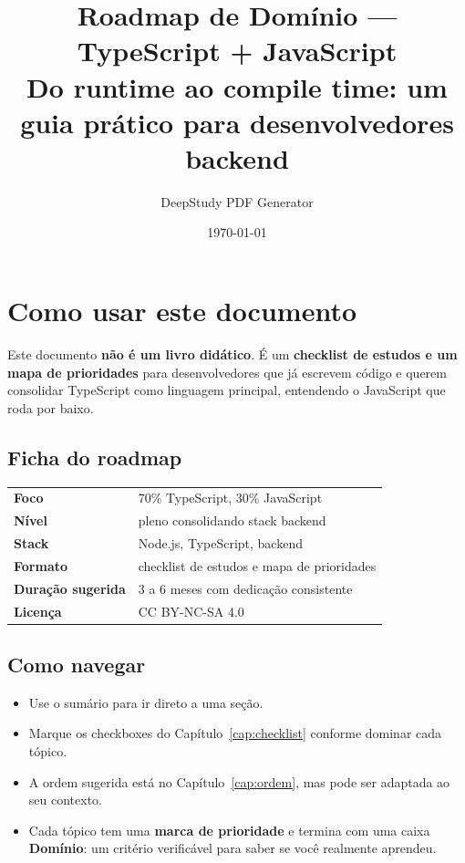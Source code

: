 \documentclass[12pt,a4paper,oneside]{book}
\title{Roadmap de Domínio --- TypeScript + JavaScript\\[0.4em]\Large Do runtime ao compile time: um guia prático para desenvolvedores backend}
\author{DeepStudy PDF Generator}
\date{\today}
\begin{document}
\maketitle
\tableofcontents

\chapter*{Como usar este documento}

Este documento \textbf{não é um livro didático}. É um \textbf{checklist de estudos e um mapa de prioridades} para desenvolvedores que já escrevem código e querem consolidar TypeScript como linguagem principal, entendendo o JavaScript que roda por baixo.

\section*{Ficha do roadmap}

\begin{tabularx}{\textwidth}{@{}lX@{}}
\toprule
\textbf{Foco} & 70\% TypeScript, 30\% JavaScript \\
\textbf{Nível} & pleno consolidando stack backend \\
\textbf{Stack} & Node.js, TypeScript, backend \\
\textbf{Formato} & checklist de estudos e mapa de prioridades \\
\textbf{Duração sugerida} & 3 a 6 meses com dedicação consistente \\
\textbf{Licença} & CC BY-NC-SA 4.0 \\
\bottomrule
\end{tabularx}

\section*{Como navegar}

\begin{itemize}
  \item Use o sumário para ir direto a uma seção.
  \item Marque os checkboxes do Capítulo~\ref{cap:checklist} conforme dominar cada tópico.
  \item A ordem sugerida está no Capítulo~\ref{cap:ordem}, mas pode ser adaptada ao seu contexto.
  \item Cada tópico tem uma \textbf{marca de prioridade} e termina com uma caixa \textbf{Domínio}: um critério verificável para saber se você realmente aprendeu.
\end{itemize}
\end{document}
